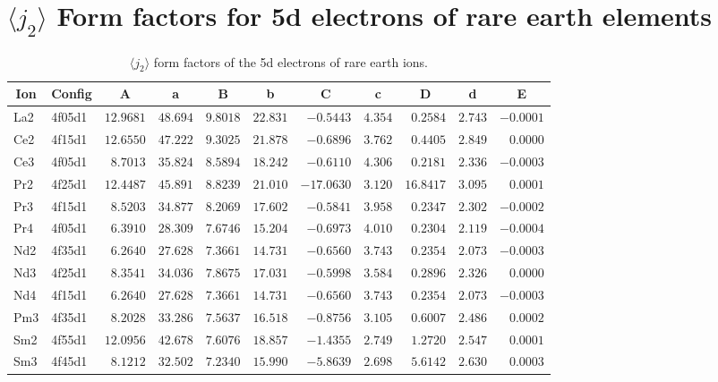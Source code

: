 \section{{\large $\langle j_2\rangle$} Form factors for 5d electrons of rare earth elements}
\begin{table}[H]
 \caption{$\langle j_2\rangle$ form factors of the 5d electrons of rare earth ions.\cite{kob:12}}
 \vspace{1ex}
 \label{re5dj2}
{\tablesize
\begin{tabular}{llrrrrrrrrr}
\hline
\multicolumn{1}{c}{ Ion}&\multicolumn{1}{c}{ Config}&\multicolumn{1}{c}{ A }&\multicolumn{1}{c}{  a }&\multicolumn{1}{c}{B }&\multicolumn{1}{c}{ b }&\multicolumn{1}{c}{ C }&\multicolumn{1}{c}{ c }&\multicolumn{1}{c}{ D }&\multicolumn{1}{c}{ d }&\multicolumn{1}{c}{E}\\
\hline
La2 & 4f05d1 &$12.9681$ &$48.694$ &$9.8018$ &$22.831$ &$-0.5443$ &$4.354$ &$0.2584$ &$2.743$ &$-0.0001$ \\
Ce2 & 4f15d1 &$12.6550$ &$47.222$ &$9.3025$ &$21.878$ &$-0.6896$ &$3.762$ &$0.4405$ &$2.849$ &$0.0000$ \\
Ce3 & 4f05d1 &$8.7013$ &$35.824$ &$8.5894$ &$18.242$ &$-0.6110$ &$4.306$ &$0.2181$ &$2.336$ &$-0.0003$ \\
Pr2 & 4f25d1 &$12.4487$ &$45.891$ &$8.8239$ &$21.010$ &$-17.0630$ &$3.120$ &$16.8417$ &$3.095$ &$0.0001$ \\
Pr3 & 4f15d1 &$8.5203$ &$34.877$ &$8.2069$ &$17.602$ &$-0.5841$ &$3.958$ &$0.2347$ &$2.302$ &$-0.0002$ \\
Pr4 & 4f05d1 &$6.3910$ &$28.309$ &$7.6746$ &$15.204$ &$-0.6973$ &$4.010$ &$0.2304$ &$2.119$ &$-0.0004$ \\
Nd2 & 4f35d1 &$6.2640$ &$27.628$ &$7.3661$ &$14.731$ &$-0.6560$ &$3.743$ &$0.2354$ &$2.073$ &$-0.0003$ \\
Nd3 & 4f25d1 &$8.3541$ &$34.036$ &$7.8675$ &$17.031$ &$-0.5998$ &$3.584$ &$0.2896$ &$2.326$ &$0.0000$ \\
Nd4 & 4f15d1 &$6.2640$ &$27.628$ &$7.3661$ &$14.731$ &$-0.6560$ &$3.743$ &$0.2354$ &$2.073$ &$-0.0003$ \\
Pm3 & 4f35d1 &$8.2028$ &$33.286$ &$7.5637$ &$16.518$ &$-0.8756$ &$3.105$ &$0.6007$ &$2.486$ &$0.0002$ \\
Sm2 & 4f55d1 &$12.0956$ &$42.678$ &$7.6076$ &$18.857$ &$-1.4355$ &$2.749$ &$1.2720$ &$2.547$ &$0.0001$ \\
Sm3 & 4f45d1 &$8.1212$ &$32.502$ &$7.2340$ &$15.990$ &$-5.8639$ &$2.698$ &$5.6142$ &$2.630$ &$0.0003$ \\

\end{tabular}}
\end{table}
